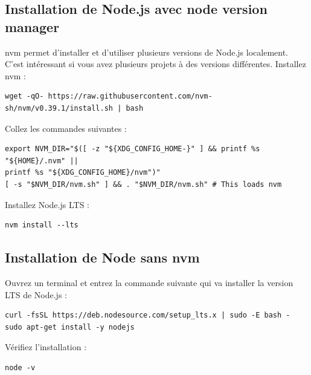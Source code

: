 \subsection{Installation de {\color{monOrange}Node.js} avec {\color{monOrange}node version manager}}
{\color{monOrange}nvm} permet d'installer et d'utiliser plusieurs versions de {\color{monOrange}Node.js} localement. C'est intéressant si vous avez plusieurs projets à des versions différentes. Installez {\color{monOrange}nvm} :

\begin{verbatim}
wget -qO- https://raw.githubusercontent.com/nvm-sh/nvm/v0.39.1/install.sh | bash
\end{verbatim}

Collez les commandes suivantes :

\begin{verbatim}
export NVM_DIR="$([ -z "${XDG_CONFIG_HOME-}" ] && printf %s "${HOME}/.nvm" || 
printf %s "${XDG_CONFIG_HOME}/nvm")"
[ -s "$NVM_DIR/nvm.sh" ] && . "$NVM_DIR/nvm.sh" # This loads nvm
\end{verbatim}

Installez {\color{monOrange}Node.js} LTS :

\begin{verbatim}
nvm install --lts
\end{verbatim}

\subsection{Installation de {\color{monOrange}Node} sans {\color{monOrange}nvm}}
Ouvrez un terminal et entrez la commande suivante qui va installer la version LTS de {\color{monOrange}Node.js} :
\begin{verbatim}
curl -fsSL https://deb.nodesource.com/setup_lts.x | sudo -E bash -
sudo apt-get install -y nodejs
\end{verbatim}

Vérifiez l'installation :
\begin{verbatim}
node -v
\end{verbatim}

